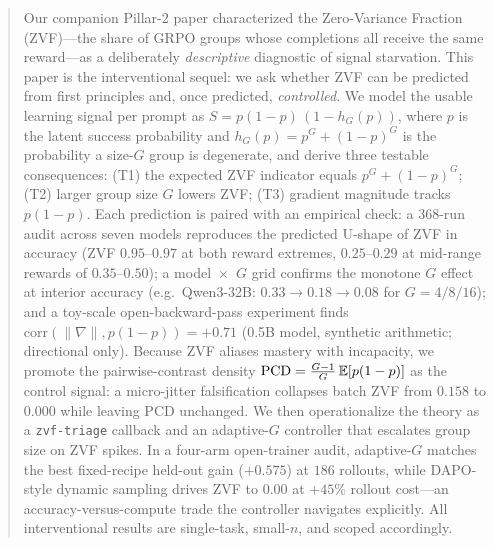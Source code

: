 \begin{abstract}
Our companion Pillar-2 paper characterized the Zero-Variance Fraction
(ZVF)---the share of GRPO groups whose completions all receive the same
reward---as a deliberately \emph{descriptive} diagnostic of signal starvation.
This paper is the interventional sequel: we ask whether ZVF can be predicted
from first principles and, once predicted, \emph{controlled}. We model the
usable learning signal per prompt as $S = p(1-p)\,(1 - h_G(p))$, where $p$ is
the latent success probability and $h_G(p) = p^G + (1-p)^G$ is the probability
a size-$G$ group is degenerate, and derive three testable consequences:
(T1) the expected ZVF indicator equals $p^G + (1-p)^G$; (T2) larger group
size $G$ lowers ZVF; (T3) gradient magnitude tracks $p(1-p)$. Each prediction
is paired with an empirical check: a 368-run audit across seven models
reproduces the predicted U-shape of ZVF in accuracy (ZVF $0.95$--$0.97$ at both
reward extremes, $0.25$--$0.29$ at mid-range rewards of $0.35$--$0.50$); a
model~$\times$~$G$ grid confirms the monotone $G$ effect at interior accuracy
(e.g.\ Qwen3-32B: $0.33 \to 0.18 \to
0.08$ for $G = 4/8/16$); and a toy-scale open-backward-pass experiment finds
$\mathrm{corr}(\|\nabla\|, p(1-p)) = +0.71$ (0.5B model, synthetic arithmetic;
directional only). Because ZVF aliases mastery with incapacity, we promote the
pairwise-contrast density $\mathrm{PCD} = \frac{G-1}{G}\,\E[p(1-p)]$ as the
control signal: a micro-jitter falsification collapses batch ZVF from $0.158$
to $0.000$ while leaving PCD unchanged. We then operationalize the theory as a
\texttt{zvf-triage} callback and an adaptive-$G$ controller that escalates
group size on ZVF spikes. In a four-arm open-trainer audit, adaptive-$G$
matches the best fixed-recipe held-out gain ($+0.575$) at $186$ rollouts,
while DAPO-style dynamic sampling drives ZVF to $0.00$ at $+45\%$ rollout
cost---an accuracy-versus-compute trade the controller navigates explicitly.
All interventional results are single-task, small-$n$, and scoped accordingly.
\end{abstract}
